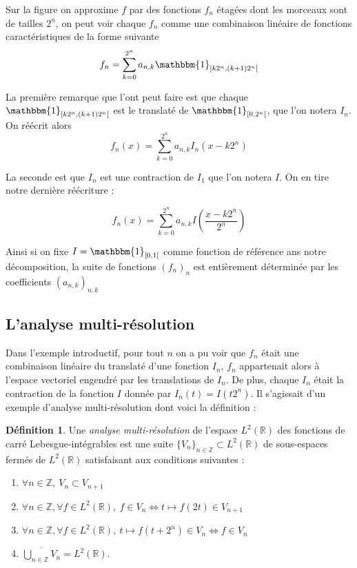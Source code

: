 \documentclass[]{article}
\theoremstyle{remark}
\theoremstyle{definition}
\newtheorem{mydef}{Définition}
\newcommand{\DS}{\displaystyle}
\begin{document}
	\newpage
	
	Sur la figure on approxime $f$ par des fonctions $f_n$ étagées dont les morceaux sont de tailles $2^n$, on peut voir chaque $f_n$ comme une combinaison linéaire de fonctions caractéristiques de la forme suivante $$f_n = \sum_{k = 0}^{2^n} a_{n, k} \mathbbm{1}_{[k 2^{n}, (k+1)2^n[}$$
	
	La première remarque que l'ont peut faire est que chaque $\mathbbm{1}_{[k 2^{n}, (k+1)2^n[}$ est le translaté de $\mathbbm{1}_{[0, 2^n[}$, que l'on notera $I_n$. On réécrit alors $$f_n(x) = \sum_{k = 0}^{2^n} a_{n, k} I_n\left(x - k 2^n\right)$$
	
	La seconde est que $I_n$ est une contraction de $I_1$ que l'on notera $I$. On en tire notre dernière réécriture :
	
	$$f_n(x) = \sum_{k = 0}^{2^n} a_{n, k} I \left(\frac{x - k 2^n}{2^n}\right)$$
	
	Ainsi si on fixe $I = \mathbbm{1}_{[0, 1[}$ comme fonction de référence ans notre décomposition, la suite de fonctions $(f_n)_n$ est entièrement déterminée par les coefficients $(a_{n, k})_{n, k}$
	
	\subsection{L'analyse multi-résolution}
	
	Dans l'exemple introductif, pour tout $n$ on a pu voir que $f_n$ était une combinaison linéaire du translaté d'une fonction $I_n$, $f_n$ appartenait alors à l'espace vectoriel engendré par les translations de $I_n$. De plus, chaque $I_n$ était la contraction de la fonction $I$ donnée par $I_n(t) = I\left(t 2^n\right)$. Il s'agissait d'un exemple d'analyse multi-résolution dont voici la définition :
	
	\begin{mydef}
		Une \textit{analyse multi-résolution} de l'espace $L^2(\mathbb{R})$ des fonctions de carré Lebesgue-intégrables est une suite $\{V_n\}_{n \in \mathbb{Z}} \subset L^2(\mathbb{R})$ de sous-espaces fermés de $L^2(\mathbb{R})$ satisfaisant aux conditions suivantes :

		\begin{enumerate}
			\item $\forall n \in \mathbb{Z}, ~ V_{n} \subset V_{n+1}$
			\item $\forall n \in \mathbb{Z}, \forall f \in L^2(\mathbb{R}), ~ f \in V_n \Longleftrightarrow t \mapsto f \left(2 t\right) \in V_{n+1}$
			\item $\forall n \in \mathbb{Z}, \forall f \in L^2(\mathbb{R}), ~ t \mapsto f \left(t + 2^n\right) \in V_n \Longleftrightarrow f \in V_n$
			\item $\DS \overline{\bigcup_{n \in \mathbb{Z}} V_n} = L^2(\mathbb{R})$.
		\end{enumerate}
	\end{mydef}
	
\end{document}
